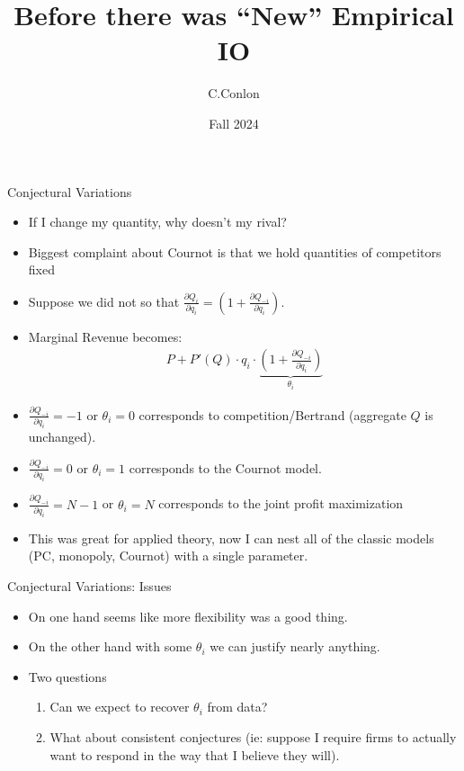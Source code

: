 

\title [``Old'' IO]{Before there was ``New'' Empirical IO}
\author{C.Conlon}
\date{Fall 2024}


\begin{frame}
\titlepage
\end{frame}

\begin{frame}{Conjectural Variations}
\small
\begin{itemize}
\item If I change my quantity, why doesn't my rival?
\item Biggest complaint about Cournot is that we hold quantities of competitors fixed
\item Suppose we did not so that $\frac{\partial Q_i}{\partial q_i} = (1 + \frac{\partial Q_{-i}}{\partial q_i}).$
\item Marginal Revenue becomes:
\begin{eqnarray*}
P + P'(Q) \cdot q_i \cdot \underbrace{\left(1+ \frac{\partial Q_{-i}}{\partial q_i} \right)}_{\theta_i}
\end{eqnarray*}
\item $\frac{\partial Q_{-i}}{\partial q_i} =-1$  or $\theta_i =0$ corresponds to competition/Bertrand (aggregate $Q$ is unchanged).
\item $\frac{\partial Q_{-i}}{\partial q_i} =0$ or $\theta_i = 1$ corresponds to the Cournot model.
\item $\frac{\partial Q_{-i}}{\partial q_i} =N-1$ or $\theta_i = N$ corresponds to the joint profit maximization
\item This was great for applied theory, now I can nest all of the classic models (PC, monopoly, Cournot) with a single parameter.
\end{itemize}
\end{frame}

\begin{frame}{Conjectural Variations: Issues}
\begin{itemize}
\item On one hand seems like more flexibility was a good thing.
\item On the other hand with some $\theta_i$ we can justify nearly anything.
\item Two questions
\begin{enumerate}
\item Can we expect to recover $\theta_i$ from data?
\item What about \alert{consistent conjectures} (ie: suppose I require firms to actually want to respond in the way that I believe they will).
\end{enumerate}
\end{itemize}
\end{frame}



